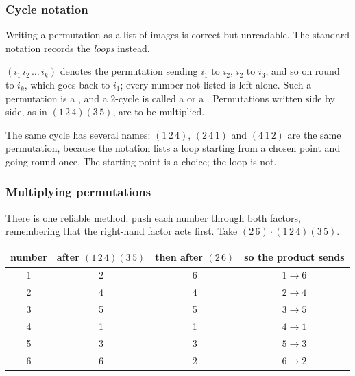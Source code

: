 

\subsubsection*{Cycle notation}

Writing a permutation as a list of images is correct but unreadable. The standard notation records
the \emph{loops} instead.

\begin{defi}
$(i_1\,i_2\,\dots\,i_k)$ denotes the permutation sending $i_1$ to $i_2$, $i_2$ to $i_3$, and so on
round to $i_k$, which goes back to $i_1$; every number not listed is left alone. Such a permutation
is a , and a $2$-cycle is called a  or a .
Permutations written side by side, as in $(1\,2\,4)(3\,5)$, are to be multiplied.
\end{defi}


\begin{pitfall}
The same cycle has several names: $(1\,2\,4)$, $(2\,4\,1)$ and $(4\,1\,2)$ are the same permutation,
because the notation lists a loop starting from a chosen point and going round once. The starting
point is a choice; the loop is not.
\end{pitfall}


\subsubsection*{Multiplying permutations}

There is one reliable method: push each number through both factors, remembering that the
right-hand factor acts first. Take $(2\,6)\cdot(1\,2\,4)(3\,5)$.

\begin{center}
\small
\begin{tabular}{@{}cccc@{}}
\toprule
number & after $(1\,2\,4)(3\,5)$ & then after $(2\,6)$ & so the product sends\\
\midrule
1 & 2 & 6 & $1\to6$\\
2 & 4 & 4 & $2\to4$\\
3 & 5 & 5 & $3\to5$\\
4 & 1 & 1 & $4\to1$\\
5 & 3 & 3 & $5\to3$\\
6 & 6 & 2 & $6\to2$\\
\bottomrule
\end{tabular}
\end{center}

